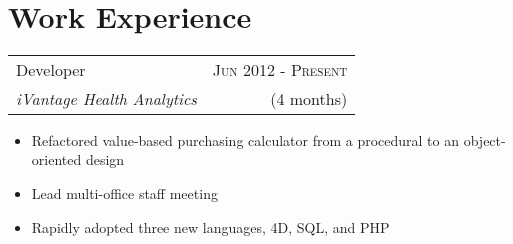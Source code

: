 \documentclass[10pt]{article} %
\begin{document}
\color{text1} %


\par{\\ %


\begin{minipage}[t]{0.5\textwidth}
\vspace{0pt} %


\section{Work Experience}


\begin{tabularx}{\linewidth}{ X r }
  {\large Developer } & {\textsc{Jun 2012 - Present}} \\
  {\small\textit{iVantage Health Analytics}} & {\small{(4 months)}}
\end{tabularx}

\begin{itemize}
  \item Refactored value-based purchasing calculator from a procedural to an object-oriented design
  \item Lead multi-office staff meeting
  \item Rapidly adopted three new languages, 4D, SQL, and PHP
\end{itemize}



\end{minipage}}
\end{document}
